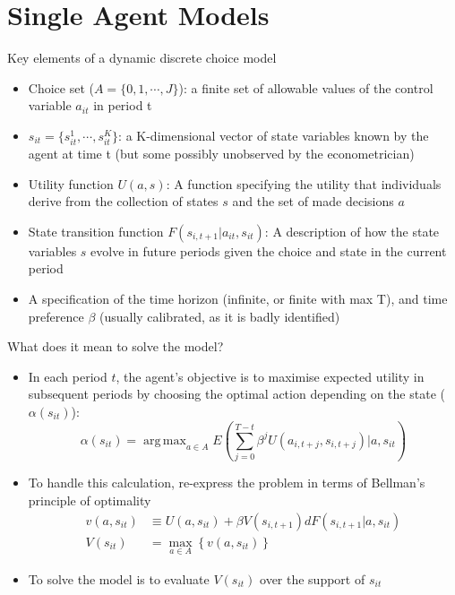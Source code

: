 \documentclass[aspectratio=169]{beamer}
\DeclareMathOperator*{\argmax}{arg\,max}
\newcommand{\mynoteGS}[1]{}
\begin{document}
	
	\section{Single Agent Models}
	
	\begin{frame}{Key elements of a dynamic discrete choice model}
		\begin{itemize}
			\itemsep1em
			\item Choice set ($A = \{0,1,\cdots,J\}$): a finite set of allowable values of the control variable $a_{it}$ in period t
			\pause
			\item $s_{it} = \{s_{it}^1,\cdots,s_{it}^K\}$: a K-dimensional vector of state variables known by the agent at time t (but some possibly unobserved by the econometrician)
			\pause
			\item Utility function $U(a,s)$: A function specifying the utility that individuals derive from the collection of states $s$ and the set of made decisions $a$
			\pause
			\item State transition function $F(s_{i,t+1}|a_{it},s_{it})$: A description of how the state variables $s$ evolve in future periods given the choice and state in the current period
			\pause
			\item A specification of the time horizon (infinite, or finite with max T), and time preference $\beta$ (usually calibrated, as it is badly identified)
		\end{itemize}
	\end{frame}
	
	\begin{frame}{What does it mean to solve the model?}
		\begin{itemize}[<+->]
			\itemsep1em
			\item In each period $t$, the agent's objective is to maximise expected utility in subsequent periods by choosing the optimal action depending on the state ($\alpha(s_{it})$):
			$$\alpha(s_{it}) = \argmax_{a \in A} E\left( \sum_{j=0}^{T-t} \beta^j U(a_{i,t+j},s_{i,t+j}) | a,s_{it} \right)$$
			\item To handle this calculation, re-express the problem in terms of Bellman's principle of optimality \mynoteGS{Struggled to explain these two during the presentation:}
			\begin{align}
				v(a,s_{it}) &\equiv U(a,s_{it}) + \beta V(s_{i,t+1}) dF(s_{i,t+1}|a,s_{it}) \\
				V(s_{it}) &= \max_{a \in A} \left\{ v(a,s_{it}) \right\}
			\end{align}
			\item To solve the model is to evaluate $V(s_{it})$ over the support of $s_{it}$
		\end{itemize}
	\end{frame}
	
\end{document}
